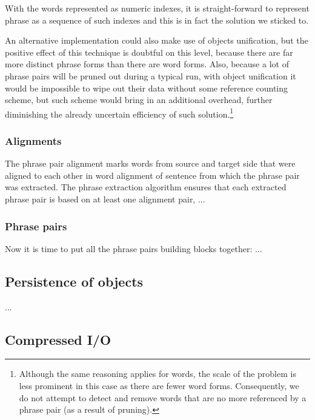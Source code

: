 With the words represented as numeric indexes, it is straight-forward to represent phrase as
a sequence of such indexes and this is in fact the solution we sticked to.

An alternative implementation could also make use of objects unification, but the positive
effect of this technique is doubtful on this level, because there are far more distinct
phrase forms than there are word forms.
Also, because a lot of phrase pairs will be pruned out during a typical \eppex{} run,
with object unification it would be impossible to wipe out their data without some reference
counting scheme, but such scheme would bring in an additional overhead, further diminishing
the already uncertain efficiency of such solution.\footnote{Although the same reasoning applies
for words, the scale of the problem is less prominent in this case as there are fewer word forms.
Consequently, we do not attempt to detect and remove words that are no more referenced by
a phrase pair (as a result of pruning).}

\subsubsection*{Alignments}

The phrase pair alignment marks words from source and target side that were aligned to
each other in word alignment of sentence from which the phrase pair was extracted.
The phrase extraction algorithm ensures that each extracted phrase pair is based on
at least one alignment pair, ...


\subsubsection*{Phrase pairs}

Now it is time to put all the phrase pairs building blocks together: ...

\subsection{Persistence of objects}

...


\subsection{Compressed I/O}

